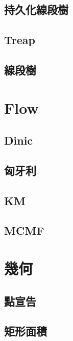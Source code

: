 \documentclass[a4paper,10pt,twocolumn,oneside]{article}
\begin{document}
\subsection{持久化線段樹}

\subsection{Treap}

\subsection{線段樹}

\section{Flow}
\subsection{Dinic}

\subsection{匈牙利}

\subsection{KM}

\subsection{MCMF}

\section{幾何}
\subsection{點宣告}

% 
\subsection{矩形面積}

\end{document}

